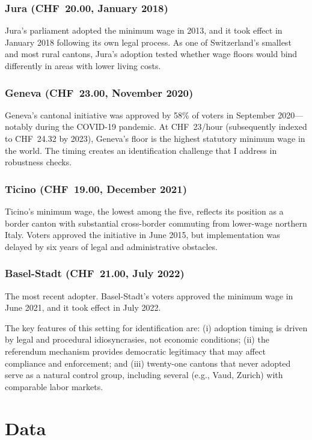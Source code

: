 \documentclass[12pt]{article}
\begin{document}
\subsubsection*{Jura (CHF~20.00, January 2018)} Jura's parliament adopted the minimum wage in 2013, and it took effect in January 2018 following its own legal process. As one of Switzerland's smallest and most rural cantons, Jura's adoption tested whether wage floors would bind differently in areas with lower living costs.

\subsubsection*{Geneva (CHF~23.00, November 2020)} Geneva's cantonal initiative was approved by 58\% of voters in September 2020---notably during the COVID-19 pandemic. At CHF~23/hour (subsequently indexed to CHF~24.32 by 2023), Geneva's floor is the highest statutory minimum wage in the world. The timing creates an identification challenge that I address in robustness checks.

\subsubsection*{Ticino (CHF~19.00, December 2021)} Ticino's minimum wage, the lowest among the five, reflects its position as a border canton with substantial cross-border commuting from lower-wage northern Italy. Voters approved the initiative in June 2015, but implementation was delayed by six years of legal and administrative obstacles.

\subsubsection*{Basel-Stadt (CHF~21.00, July 2022)} The most recent adopter. Basel-Stadt's voters approved the minimum wage in June 2021, and it took effect in July 2022.

The key features of this setting for identification are: (i) adoption timing is driven by legal and procedural idiosyncrasies, not economic conditions; (ii) the referendum mechanism provides democratic legitimacy that may affect compliance and enforcement; and (iii) twenty-one cantons that never adopted serve as a natural control group, including several (e.g., Vaud, Zurich) with comparable labor markets.

\section{Data}
\label{sec:data}
\end{document}
